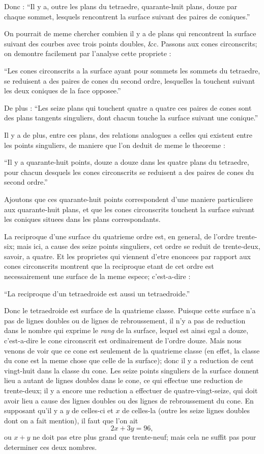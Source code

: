 \documentclass[11pt,a4paper]{book}
\begin{document}
Donc : ``Il y a, outre les plans du tetraedre, quarante-huit plans, douze par chaque sommet, lesquels rencontrent la surface suivant des paires de coniques.''

On pourrait de meme chercher combien il y a de plans qui rencontrent la surface suivant des courbes avec trois points doubles, \&c. Passons aux cones circonscrits; on demontre facilement par l'analyse cette propriete :

``Les cones circonscrits a la surface ayant pour sommets les sommets du tetraedre, se reduisent a des paires de cones du second ordre, lesquelles la touchent suivant les deux coniques de la face opposee.''

De plus : ``Les seize plans qui touchent quatre a quatre ces paires de cones sont des plans tangents singuliers, dont chacun touche la surface suivant une conique.''

Il y a de plus, entre ces plans, des relations analogues a celles qui existent entre les points singuliers, de maniere que l'on deduit de meme le theoreme :

``Il y a quarante-huit points, douze a douze dans les quatre plans du tetraedre, pour chacun desquels les cones circonscrits se reduisent a des paires de cones du second ordre.''

Ajoutons que ces quarante-huit points correspondent d'une maniere particuliere aux quarante-huit plans, et que les cones circonscrits touchent la surface suivant les coniques situees dans les plans correspondants.

La reciproque d'une surface du quatrieme ordre est, en general, de l'ordre trente-six; mais ici, a cause des seize points singuliers, cet ordre se reduit de trente-deux, savoir, a quatre. Et les proprietes qui viennent d'etre enoncees par rapport aux cones circonscrits montrent que la reciproque etant de cet ordre est necessairement une surface de la meme espece; c'est-a-dire :

``La reciproque d'un tetraedroide est aussi un tetraedroide.''

Donc le tetraedroide est surface de la quatrieme classe. Puisque cette surface n'a pas de lignes doubles ou de lignes de rebroussement, il n'y a pas de reduction dans le nombre qui exprime le \textit{rang} de la surface, lequel est ainsi egal a douze, c'est-a-dire le cone circonscrit est ordinairement de l'ordre douze. Mais nous venons de voir que ce cone est seulement de la quatrieme classe (en effet, la classe du cone est la meme chose que celle de la surface); donc il y a reduction de cent vingt-huit dans la classe du cone. Les seize points singuliers de la surface donnent lieu a autant de lignes doubles dans le cone, ce qui effectue une reduction de trente-deux; il y a encore une reduction a effectuer de quatre-vingt-seize, qui doit avoir lieu a cause des lignes doubles ou des lignes de rebroussement du cone. En supposant qu'il y a $y$ de celles-ci et $x$ de celles-la (outre les seize lignes doubles dont on a fait mention), il faut que l'on ait
\[
2x + 3y = 96,
\]
ou $x + y$ ne doit pas etre plus grand que trente-neuf; mais cela ne suffit pas pour determiner ces deux nombres.
\end{document}
